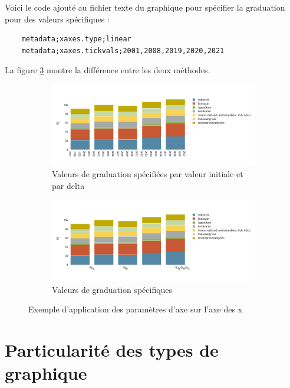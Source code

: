 \documentclass[11pt]{article}
\begin{document}
Voici le code ajouté au fichier texte du graphique pour spécifier la graduation pour des valeurs spécifiques :

\begin{lstlisting}
    metadata;xaxes.type;linear
    metadata;xaxes.tickvals;2001,2008,2019,2020,2021
\end{lstlisting}

La figure \ref{fig:exempleGraduation} montre la différence entre les deux méthodes.

\begin{figure}[h]
    \centering
    \begin{subfigure}{.5\textwidth}
      \centering
      \includegraphics[width=\linewidth]{assets/fig3.2_linear_tickmode.png}
      \caption{Valeurs de graduation spécifiées par valeur initiale et par delta}
      \label{fig:grad1}
    \end{subfigure}%
    \begin{subfigure}{.5\textwidth}
      \centering
      \includegraphics[width=\linewidth]{assets/fig3.2_linear_tickvals.png}
      \caption{Valeurs de graduation spécifiques}
      \label{fig:grad2}
    \end{subfigure}
    \caption{Exemple d'application des paramètres d'axe sur l'axe des x}
    \label{fig:exempleGraduation}
    \end{figure}


\pagebreak
\section{Particularité des types de graphique}
\end{document}
